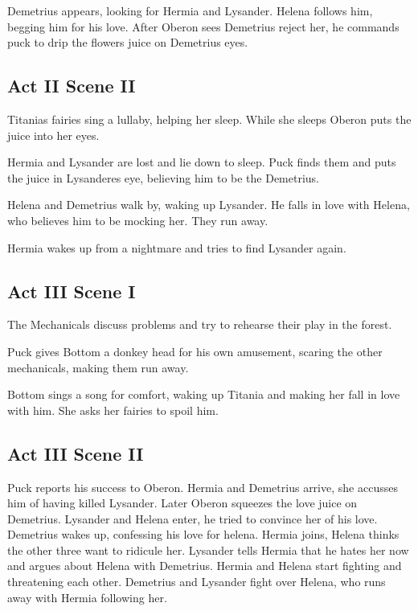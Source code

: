 \documentclass{article}
\begin{document}
Demetrius appears, looking for Hermia and Lysander. Helena follows him, begging him for his love. After Oberon sees Demetrius reject her, he commands puck to drip the flowers juice on Demetrius eyes. 
 
\subsection{Act II Scene II}
Titanias fairies sing a lullaby, helping her sleep. While she sleeps Oberon puts the juice into her eyes.
 
Hermia and Lysander are lost and lie down to sleep. Puck finds them and puts the juice in Lysanderes eye, believing him to be the Demetrius.
 
Helena and Demetrius walk by, waking up Lysander. He falls in love with Helena, who believes him to be mocking her. They run away.
 
Hermia wakes up from a nightmare and tries to find Lysander again.
 
\subsection{Act III Scene I} 
The Mechanicals discuss problems and try to rehearse their play in the forest.
 
Puck gives Bottom a donkey head for his own amusement, scaring the other mechanicals, making them run away.
 
Bottom sings a song for comfort, waking up Titania and making her fall in love with him. She asks her fairies to spoil him.  
 
\subsection{Act III Scene II} 
Puck reports his success to Oberon. 
Hermia and Demetrius arrive, she accusses him of having killed Lysander. 
Later Oberon squeezes the love juice on Demetrius. 
Lysander and Helena enter, he tried to convince her of his love. 
Demetrius wakes up, confessing his love for helena. 
Hermia joins, Helena thinks the other three want to ridicule her.
Lysander tells Hermia that he hates her now and argues about Helena with Demetrius.
Hermia and Helena start fighting and threatening each other.
Demetrius and Lysander fight over Helena, who runs away with Hermia following her.
 
\end{document}
